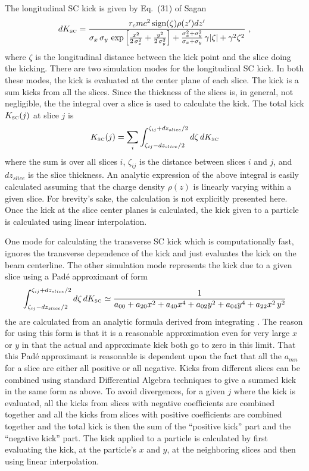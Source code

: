 The longitudinal SC kick is given by Eq.~(31) of Sagan\cite{b:csr} 
\begin{equation}
 d K_{\mbox{\tiny SC}} =
  \frac{ r_c m c^2 \, \mbox{sign}(\zeta)\rho(z')dz'}
  {\sigma_x \, \sigma_y \, \exp
  \left[ \frac{x^2}{2 \, \sigma_x^2} + \frac{y^2}{2 \, \sigma_y^2} \right] +
  \frac{\sigma_x^2 + \sigma_y^2}{\sigma_x + \sigma_y} \, \gamma |\zeta| + \gamma^2\zeta^2}\ ,
  \label{kelsz}
\end{equation}
where $\zeta$ is the longitudinal distance between the kick point and the slice doing the kicking.
There are two simulation modes for the longitudinal SC kick. In both these modes, the kick is
evaluated at the center plane of each slice. The kick is a sum kicks from all the slices. Since the
thickness of the slices is, in general, not negligible, the the integral over a slice is used to
calculate the kick. The total kick $K_{\mbox{\tiny SC}}(j)$ at slice $j$ is
\begin{equation}
  K_{\mbox{\tiny SC}} (j) = 
  \sum_i \int_{\zeta_{ij}-dz_{slice}/2}^{\zeta_{ij}+dz_{slice}/2} d\zeta \, dK_{\mbox{\tiny SC}}
\end{equation}
where the sum is over all slices $i$, $\zeta_{ij}$ is the distance between slices $i$ and $j$, and
$dz_{slice}$ is the slice thickness. An analytic expression of the above integral is easily
calculated assuming that the charge density $\rho(z)$ is linearly varying within a given slice.  For
brevity's sake, the calculation is not explicitly presented here. Once the kick at the slice center
planes is calculated, the kick given to a particle is calculated using linear interpolation.

One mode for calculating the transverse SC kick which is computationally fast, ignores the
transverse dependence of the kick and just evaluates the kick on the beam centerline. The other
simulation mode represents the kick due to a given slice using a Pad{\'e} approximant of form
\begin{equation}
  \int_{\zeta_{ij}-dz_{slice}/2}^{\zeta_{ij}+dz_{slice}/2} d\zeta \, dK_{\mbox{\tiny SC}}
  \simeq \frac{1}{a_{00} + a_{20} x^2 + a_{40} x^4 + a_{02} y^2 + a_{04} y^4 + a_{22} x^2 \, y^2}
\end{equation}
the  are calculated from an analytic formula derived from integrating . The
reason for using this form is that it is a reasonable approximation even for very large $x$ or $y$
in that the actual and approximate kick both go to zero in this limit. That this Pad{\'e}
approximant is reasonable is dependent upon the fact that all the $a_{mn}$ for a slice are either
all positive or all negative. Kicks from different slices can be combined using standard
Differential Algebra techniques to give a summed kick in the same form as above. To avoid
divergences, for a given $j$ where the kick is evaluated, all the kicks from slices with negative
coefficients are combined together and all the kicks from slices with positive coefficients are
combined together and the total kick is then the sum of the ``positive kick'' part and the
``negative kick'' part. The kick applied to a particle is calculated by first evaluating the kick,
at the particle's $x$ and $y$, at the neighboring slices and then using linear interpolation.

